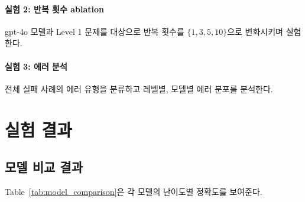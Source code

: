 \documentclass[sigplan,screen,review,anonymous]{acmart}
\begin{document}
\paragraph{실험 2: 반복 횟수 ablation} gpt-4o 모델과 Level 1 문제를 대상으로 반복 횟수를 $\{1, 3, 5, 10\}$으로 변화시키며 실험한다.

\paragraph{실험 3: 에러 분석} 전체 실패 사례의 에러 유형을 분류하고 레벨별, 모델별 에러 분포를 분석한다.


\section{실험 결과}
\label{sec:evaluation}

\subsection{모델 비교 결과}

Table~\ref{tab:model_comparison}은 각 모델의 난이도별 정확도를 보여준다.
\end{document}
